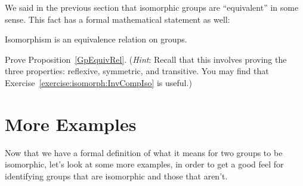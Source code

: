 We said in the previous section that isomorphic groups are ``equivalent'' in some sense. This fact has a formal mathematical statement as well:

\begin{thm}\label{GpEquivRel}
Isomorphism is an equivalence relation on groups. 
\end{thm}

\begin{exercise}
Prove Proposition~\ref{GpEquivRel}.  (\emph{Hint}: Recall that this involves proving the three properties: reflexive, symmetric, and transitive. You may find that Exercise~\ref{exercise:isomorph:InvCompIso}  is useful.)
\end{exercise}

\section{More Examples}\label{iso_more_ex}

Now that we have a formal definition of what it means for two groups to be isomorphic, let's look at some more examples, in order to get a good feel for identifying groups that are isomorphic and those that aren't.



